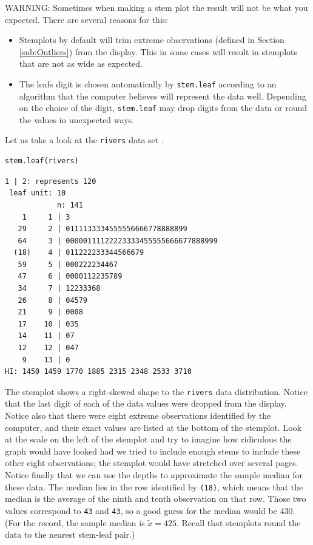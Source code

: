 \documentclass[captions=tableheading]{scrbook}
\begin{document}
WARNING: Sometimes when making a stem plot the result will not be what you expected. There are several reasons for this: 
\begin{itemize}
\item Stemplots by default will trim extreme observations (defined in Section \ref{sub:Outliers}) from the display. This in some cases will result in stemplots that are not as wide as expected.
\item The leafs digit is chosen automatically by \texttt{stem.leaf} according to an algorithm that the computer believes will represent the data well. Depending on the choice of the digit, \texttt{stem.leaf} may drop digits from the data or round the values in unexpected ways.
\end{itemize}

Let us take a look at the \texttt{rivers} data set
\label{ite:stemplot-rivers}.


\begin{verbatim}
stem.leaf(rivers)
\end{verbatim}


\begin{verbatim}
1 | 2: represents 120
 leaf unit: 10
            n: 141
    1     1 | 3
   29     2 | 0111133334555556666778888899
   64     3 | 00000111122223333455555666677888999
  (18)    4 | 011222233344566679
   59     5 | 000222234467
   47     6 | 0000112235789
   34     7 | 12233368
   26     8 | 04579
   21     9 | 0008
   17    10 | 035
   14    11 | 07
   12    12 | 047
    9    13 | 0
HI: 1450 1459 1770 1885 2315 2348 2533 3710
\end{verbatim}

The stemplot shows a right-skewed shape to the \texttt{rivers} data distribution. Notice that the last digit of each of the data values were dropped from the display. Notice also that there were eight extreme observations identified by the computer, and their exact values are listed at the bottom of the stemplot. Look at the scale on the left of the stemplot and try to imagine how ridiculous the graph would have looked had we tried to include enough stems to include these other eight observations; the stemplot would have stretched over several pages. Notice finally that we can use the depths to approximate the sample median for these data. The median lies in the row identified by \texttt{(18)}, which means that the median is the average of the ninth and tenth observation on that row. Those two values correspond to \texttt{43} and \texttt{43}, so a good guess for the median would be 430. (For the record, the sample median is \(\widetilde{x}=425\). Recall that stemplots round the data to the nearest stem-leaf pair.) 
\end{document}
